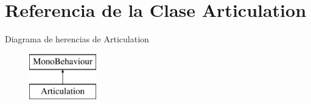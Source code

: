 \hypertarget{class_articulation}{}\section{Referencia de la Clase Articulation}
\label{class_articulation}
Diagrama de herencias de Articulation\begin{figure}[H]
\begin{center}
\leavevmode
\includegraphics[height=2.000000cm]{class_articulation}
\end{center}
\end{figure}
